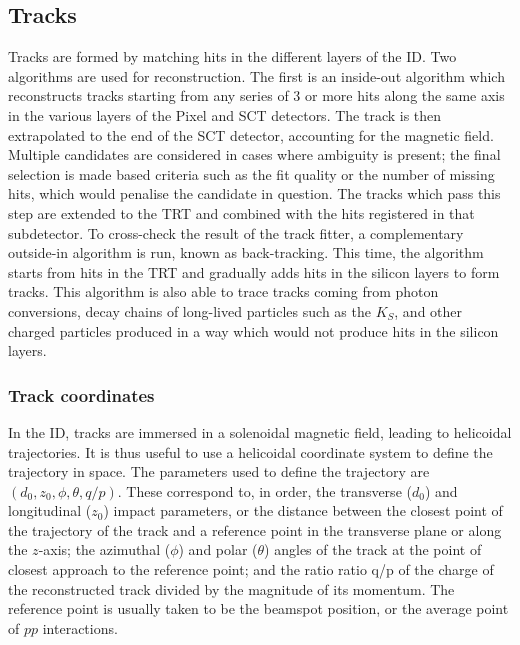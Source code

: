 \documentclass[10pt,a4paper]{book}
\begin{document}
\subsection{Tracks}
Tracks are formed by matching hits in the different layers of the ID. Two algorithms are used for reconstruction. The first is an inside-out algorithm which reconstructs tracks starting from any series of 3 or more hits along the same axis in the various layers of the Pixel and SCT detectors. The track is then extrapolated to the end of the SCT detector, accounting for the magnetic field. Multiple candidates are considered in cases where ambiguity is present; the final selection is made based criteria such as the fit quality or the number of missing hits, which would penalise the candidate in question. The tracks which pass this step are extended to the TRT and combined with the hits registered in that subdetector. 
To cross-check the result of the track fitter, a complementary outside-in algorithm is run, known as back-tracking. This time, the algorithm starts from hits in the TRT and gradually adds hits in the silicon layers to form tracks. This algorithm is also able to trace tracks coming from photon conversions, decay chains of long-lived particles such as the $K_S$, and other charged particles produced in a way which would not produce hits in the silicon layers. 

\subsubsection{Track coordinates}
In the ID, tracks are immersed in a solenoidal magnetic field, leading to helicoidal trajectories. It is thus useful to use a helicoidal coordinate system to define the trajectory in space. The parameters used to define the trajectory are $(d_0, z_0, \phi, \theta, q/p)$. These correspond to, in order, the transverse ($d_0$) and longitudinal ($z_0$) impact parameters, or the distance between the closest point of the trajectory of the track and a reference point in the transverse plane or along the $z$-axis; the azimuthal ($\phi$) and polar ($\theta$) angles of the track at the point of closest approach to the reference point; and the ratio ratio q/p of the charge of the reconstructed track divided by the magnitude of its momentum. The reference point is usually taken to be the beamspot position, or the average point of $pp$ interactions.
\end{document}
